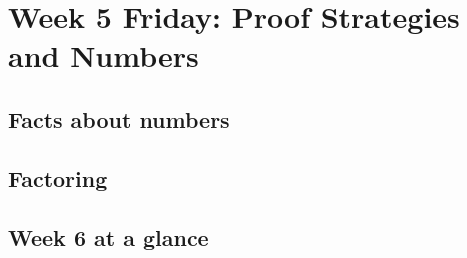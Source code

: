 
\newpage


\vfill

\vfill
\newpage


\newpage
%

\newpage
\section*{Week 5 Friday: Proof Strategies and Numbers}

\subsection*{Facts about numbers}


\subsection*{Factoring}

\newpage



\newpage




\newpage

\subsection*{Week 6 at a glance}

